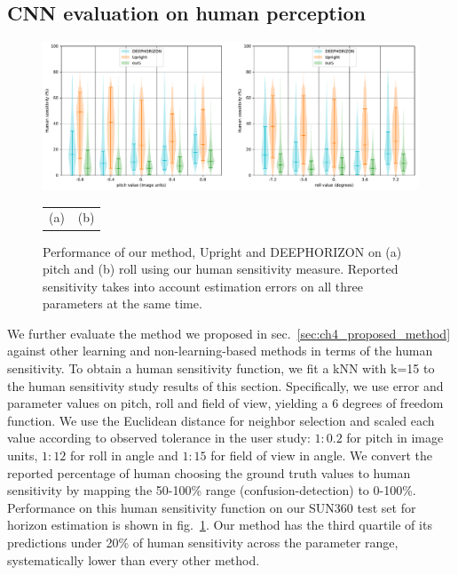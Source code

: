 \subsection{CNN evaluation on human perception}
\label{sec:cnn-evaluation-perception}

\begin{figure}
\centering
\includegraphics[width=\linewidth]{figures/method/human_sensitivity_performance_SUN360.pdf}
\begin{tabular}{p{0.5\linewidth}p{0.5\linewidth}}
\hspace{1.5cm}(a) & \hspace{1.3cm}(b)
\end{tabular}
\caption{Performance of our method, Upright and DEEPHORIZON on (a) pitch and (b) roll using our human sensitivity measure. Reported sensitivity takes into account estimation errors on all three parameters at the same time.}
\label{fig:method_human_performance}
\end{figure}


We further evaluate the method we proposed in sec.~\ref{sec:ch4_proposed_method} against other learning and non-learning-based methods in terms of the human sensitivity. To obtain a human sensitivity function, we fit a kNN with k=15 to the human sensitivity study results of this section. Specifically, we use error and parameter values on pitch, roll and field of view, yielding a 6 degrees of freedom function. We use the Euclidean distance for neighbor selection and scaled each value according to observed tolerance in the user study: $1{:}0.2$ for pitch in image units, $1{:}12$ for roll in angle and $1{:}15$ for field of view in angle. We convert the reported percentage of human choosing the ground truth values to human sensitivity by mapping the 50-100\% range (confusion-detection) to 0-100\%. Performance on this human sensitivity function on our SUN360 test set for horizon estimation is shown in fig.~\ref{fig:method_human_performance}. Our method has the third quartile of its predictions under 20\% of human sensitivity across the parameter range, systematically lower than every other method.
